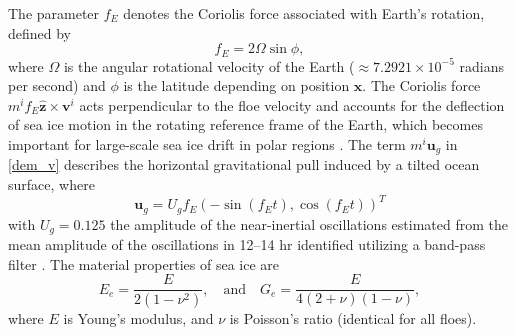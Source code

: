 \documentclass[a4paper,11pt]{article}
\numberwithin{equation}{section}
\theoremstyle{definition}
\newcommand{\bfs}[1]{{\boldsymbol #1}}
\newcommand{\bfx}{\boldsymbol{x}}
\newcommand{\bfv}{\boldsymbol{v}}
\newcommand{\bfuu}{\boldsymbol{u}}
\begin{document}
The parameter 
$f_E$ denotes the Coriolis force associated with Earth's rotation, defined by
\[
f_E = 2\Omega \sin\phi,
\]
where $\Omega$ is the angular rotational velocity of the Earth (\( \approx 7.2921 \times 10^{-5}\) radians per second) and $\phi$ is the latitude depending on position $\bfx$. 
The Coriolis force $m^i f_E \hat{\bfs{z}}\times \bfv^i$ acts perpendicular to the floe velocity and accounts for the deflection of sea ice motion in the rotating reference frame of the Earth, which becomes important for large-scale sea ice drift in polar regions \cite{cushman2011introduction,alberello2020drift}.
The term $m^i \bfuu_g$ in \eqref{dem_v} describes the horizontal gravitational pull induced by a tilted ocean surface, where 
\[
\bfuu_g = U_g f_E (-\sin(f_E t), \cos(f_E t))^T
\]
with $U_g = 0.125$ the amplitude of the near-inertial oscillations estimated from the mean amplitude of the oscillations in 12–14 hr identified utilizing a band-pass filter \cite{alberello2020drift, cushman2011introduction, lepparanta2005drift}.
%
The material properties of sea ice are
%
\begin{equation} \label{eq:EG}
E_e = \frac{E}{2(1 - \nu^2)}, \quad \text{and} \quad G_e = \frac{E}{4(2+\nu)(1-\nu)},
\end{equation}
where $E$ is Young's modulus, and $\nu$ is Poisson's ratio (identical for all floes).
\end{document}
